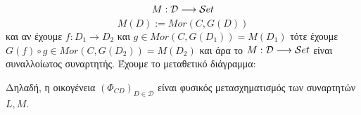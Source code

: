 $$M:\mathcal{D} \longrightarrow \mathcal{S} et$$
$$M(D):= Mor(C,G(D))$$ και αν έχουμε $f:D_1\longrightarrow D_2$ και $g \in Mor(C,G(D_1)) = M(D_1)$ τότε έχουμε $G(f)\circ g \in Mor(C,G(D_2)) = M(D_2)$ και άρα το $M:\mathcal{D} \longrightarrow \mathcal{S} et$ είναι συναλλοίωτος συναρτητής. Έχουμε το μεταθετικό διάγραμμα:

\begin{figure}[H]
    \centering
    \end{figure}
\noindent Δηλαδή, η οικογένεια $(\Phi_{CD})_{D \in \mathcal{D}}$ είναι φυσικός μετασχηματισμός των συναρτητών $L,M$.
